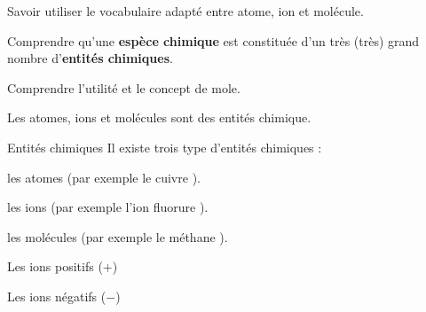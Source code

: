 \sndEnTeteTrois

\vspace*{-32pt}


\begin{objectifs}
  \item Savoir utiliser le vocabulaire adapté entre atome, ion et molécule.
  \item Comprendre qu'une \textbf{espèce chimique} est constituée d'un très (très) grand nombre d'\textbf{entités chimiques}.
  \item Comprendre l'utilité et le concept de mole.
\end{objectifs}

\begin{contexte}
  
  Les atomes, ions et molécules sont des entités chimique.
  
\end{contexte}



\begin{doc}{Entités chimiques}
  Il existe trois type d'entités chimiques :
  \begin{listePoints}
    \item les atomes (par exemple le cuivre ).
    \item les ions (par exemple l'ion fluorure ).
    \item les molécules (par exemple le méthane ).
  \end{listePoints}
  
  \begin{encart}
    Les ions positifs ($+$) \reponseLigne %
    
    Les ions négatifs ($-$) \dotfill %
  \end{encart}
\end{doc}

